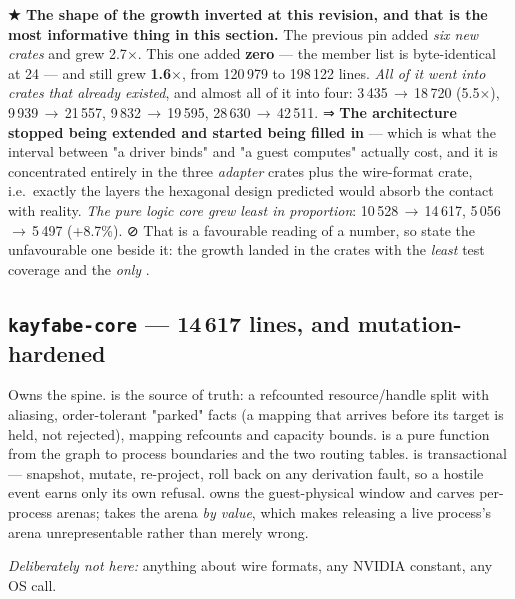 \documentclass[10.5pt]{article}
\begin{document}
\textbf{★ The shape of the growth inverted at this revision, and that is the most informative
thing in this section.} The previous pin added \emph{six new crates} and grew 2.7$\times$. This one
added \textbf{zero} — the member list is byte-identical at 24 — and still grew \textbf{1.6$\times$},
from 120\,979 to 198\,122 lines. \emph{All of it went into crates that already existed}, and almost
all of it into four:  3\,435\,$\to$\,18\,720 (5.5$\times$),
 9\,939\,$\to$\,21\,557, 
9\,832\,$\to$\,19\,595,  28\,630\,$\to$\,42\,511. ⇒ \textbf{The architecture
stopped being extended and started being filled in} — which is what the interval between "a
driver binds" and "a guest computes" actually cost, and it is concentrated entirely in the three
\emph{adapter} crates plus the wire-format crate, i.e.\ exactly the layers the hexagonal design
predicted would absorb the contact with reality. \emph{The pure logic core grew least in
proportion}:  10\,528\,$\to$\,14\,617, 
5\,056\,$\to$\,5\,497 (+8.7\%). ⊘ That is a favourable reading of a number, so state the
unfavourable one beside it: the growth landed in the crates with the \emph{least} test coverage
and the \emph{only} .

\newcommand{\crate}[3]{\subsection{\texttt{#1} \normalfont\small — #2 lines, #3}}

\crate{kayfabe-core}{14\,617}{\built{} and mutation-hardened}
Owns the spine.  is the source of truth: a refcounted resource/handle split with
 aliasing, order-tolerant "parked" facts (a mapping that arrives before its
target is held, not rejected), mapping refcounts and capacity bounds.  is a pure
function from the graph to process boundaries and the two routing tables.  is
transactional — snapshot, mutate, re-project, roll back on any derivation fault, so a hostile
event earns only its own refusal.  owns the guest-physical window and carves
per-process arenas;  takes the arena \emph{by value}, which makes
releasing a live process's arena unrepresentable rather than merely wrong.

\emph{Deliberately not here:} anything about wire formats, any NVIDIA constant, any OS call.
\end{document}
